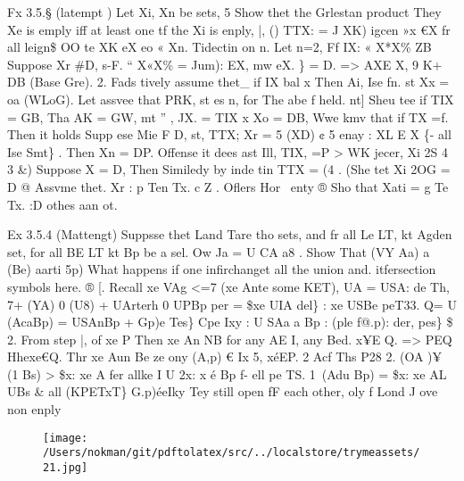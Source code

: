 \documentclass[a4paper,12pt]{article}
\begin{document}
\vspace{10pt}

    Fx 3.5.§ (latempt )  Let Xi, Xn be sets, 5  Show thet the Grlestan product They Xe is emply iff at least one tf the Xi is enply,    |, ()    TTX: = J XK) igcen »x €X fr all leign\$  OO te XK eX eo « Xn.  Tidectin on n. Let n=2, Ff IX: « X*X\% ZB  Suppose Xr \#D, s-F. “   X«X\% = Jum): EX, mw eX. \} = D.  => AXE X, 9 K+ DB (Base Gre).    2. Fads tively assume thet\_ if IX bal x Then Ai, Ise fn. st Xx = oa  (WLoG). Let assvee that PRK, st es n, for The abe f held.  nt]  Sheu tee if TIX = GB, Tha AK = GW,    mt ” ,   JX. = TIX x Xo = DB, Wwe kmv that if TX =f. Then it holds  Supp ese Mie F D, st, TTX; Xr = 5 (XD) ¢ 5 enay : XL E X \{- all Ise Smt\}  . Then Xn = DP. Offense it dees ast Ill,   TIX, =P > WK jecer, Xi 2S  4  3 \&)  Suppose X = D, Then Similedy by inde tin TTX = (4 .  (She tet Xi 2OG = D  @ Assvme thet. Xr : p Ten Tx. c Z . Oflers Hor ~enty  ® Sho that Xati = g Te Tx. :D othes aan ot. 

\vspace{10pt}

\par

\vspace{10pt}

    Ex 3.5.4 (Mattengt)    Suppsse thet Land Tare tho sets, and fr all Le LT, kt Agden set,  for all BE LT kt Bp be a sel.   Ow Ja = U CA a8 .  Show That (VY Aa) a (Be) aarti 5p)    What happens if one infirchanget all the union and. itfersection symbols here. ®  [. Recall xe VAg <=7 (xe Ante some KET), UA = USA: de Th,  7+ (YA) 0 (U8) + UArterh 0 UPBp per  = \$xe UIA del\} : xe USBe peT33.  Q= U (AcaBp) = USAnBp + Gp)e Tes\}    Cpe Ixy : U SAa a Bp : (ple f@.p): der, pes\} \$    2. From step |, of xe P Then xe An NB for any AE I, any Bed.  x¥E Q. => PEQ  Hhexe€Q. Thr xe Aun Be ze ony (A,p) € Ix 5,  xéEP. 2 Acf    Ths P28    2. (OA )¥ (1 Bs) > \$x: xe A fer allke I U 2x: x é Bp f- ell pe TS.    1\ (Adu Bp) = \$x: xe AL UBs \& all (KPETxT\}  G.p)éeIky    Tey still open fF each other, oly f Lond J ove non enply 

\vspace{10pt}

\par

\vspace{10pt}

\begin{figure}[h]

\texttt{[image: /Users/nokman/git/pdftolatex/src/../localstore/trymeassets/21.jpg]}

\centering

\end{figure}
\end{document}
